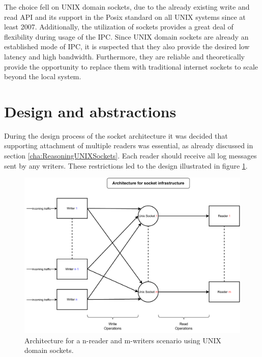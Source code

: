 The choice fell on UNIX domain sockets, due to the already existing write and read \ac{API} and its support in the Posix standard on all UNIX systems since at least 2007\cite{posix}.
Additionally, the utilization of sockets provides a great deal of flexibility during usage of the \ac{IPC}.
Since UNIX domain sockets are already an established mode of \ac{IPC}, it is suspected that they also provide the desired low latency and high bandwidth.
Furthermore, they are reliable\cite{man:unixsockets} and theoretically provide the opportunity to replace them with traditional internet sockets to scale beyond the local system.

\section{Design and abstractions}
\label{sec:Design_and_abstractions}
During the design process of the socket architecture it was decided that supporting attachment of multiple readers was essential, as already discussed in section \ref{cha:ReasoningUNIXSockets}.
Each reader should receive all log messages sent by any writers.
These restrictions led to the design illustrated in figure \ref{fig:socket:architecture}.

\begin{figure}[h!]
    \centerline{\includegraphics[width=1.2\textwidth]{images/SocketArchitecture.pdf}}
    \caption[General design of socket architecture]{
        Architecture for a n-reader and m-writers scenario using UNIX domain sockets.}
	\label{fig:socket:architecture}
\end{figure}

